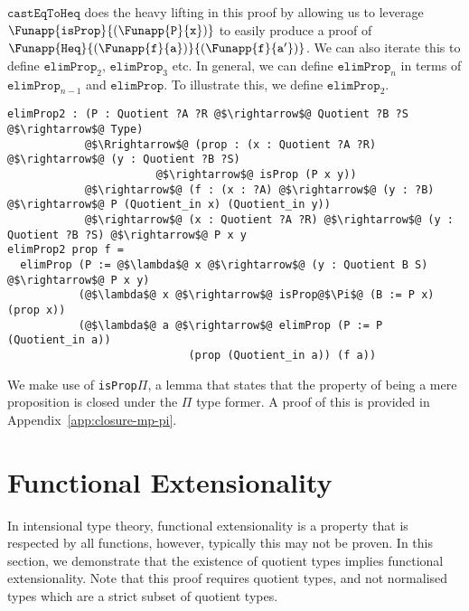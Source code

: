 \documentclass[12pt,twoside,maitrise]{dms}
\theoremstyle{definition}
\numberwithin{equation}{section}
\numberwithin{table}{chapter}
\numberwithin{figure}{chapter}
\newcommand\id[1] {\texttt{#1}}
\newcommand\fn[1] {\texttt{#1}}
\begin{document}
$\fn{castEqToHeq}$ does the heavy lifting in this proof by allowing us to leverage $\Funapp{\fn{isProp}}{(\Funapp{\id{P}}{\id{x}})}$ to easily produce a proof of $\Funapp{\id{Heq}}{(\Funapp{\id{f}}{\id{a}})}{(\Funapp{\id{f}}{\id{a}'})}$. We can also iterate this to define $\fn{elimProp}_2$, $\fn{elimProp}_3$ etc. In general, we can define $\fn{elimProp}_n$ in terms of $\fn{elimProp}_{n-1}$ and $\fn{elimProp}$. To illustrate this, we define $\fn{elimProp}_2$.

\begin{verbatim}
elimProp2 : (P : Quotient ?A ?R @$\rightarrow$@ Quotient ?B ?S @$\rightarrow$@ Type)
            @$\Rrightarrow$@ (prop : (x : Quotient ?A ?R) @$\rightarrow$@ (y : Quotient ?B ?S)
                       @$\rightarrow$@ isProp (P x y))
            @$\rightarrow$@ (f : (x : ?A) @$\rightarrow$@ (y : ?B) @$\rightarrow$@ P (Quotient_in x) (Quotient_in y))
            @$\rightarrow$@ (x : Quotient ?A ?R) @$\rightarrow$@ (y : Quotient ?B ?S) @$\rightarrow$@ P x y
elimProp2 prop f =
  elimProp (P := @$\lambda$@ x @$\rightarrow$@ (y : Quotient B S) @$\rightarrow$@ P x y)
           (@$\lambda$@ x @$\rightarrow$@ isProp@$\Pi$@ (B := P x) (prop x))
           (@$\lambda$@ a @$\rightarrow$@ elimProp (P := P (Quotient_in a))
                            (prop (Quotient_in a)) (f a))
\end{verbatim}

We make use of \id{isProp$\Pi$}, a lemma that states that the property of being
a mere proposition is closed under the $\Pi$ type former. A proof of this is
provided in Appendix~\ref{app:closure-mp-pi}.

\section{Functional Extensionality}\label{sec:quot-implies-funext}

In intensional type theory, functional extensionality is a property that is
respected by all functions, however, typically this may not be proven. In this
section, we demonstrate that the existence of quotient types implies functional
extensionality. Note that this proof requires quotient types, and not normalised
types which are a strict subset of quotient types.
\end{document}
